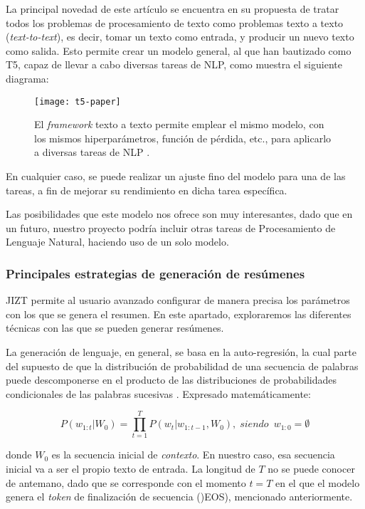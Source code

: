 La principal novedad de este artículo se encuentra en su propuesta de tratar todos los problemas de procesamiento de texto como problemas texto a texto (\emph{text-to-text}), es decir, tomar un texto como entrada, y producir un nuevo texto como salida. Esto permite crear un modelo general, al que han bautizado como T5, capaz de llevar a cabo diversas tareas de NLP, como muestra el siguiente diagrama:

\bigskip


\begin{figure}[h]
	\centering
	\texttt{[image: t5-paper]}
	\caption[Ejemplo del modelo T5 de Google.]{El \emph{framework} texto a texto permite emplear el mismo modelo, con los mismos hiperparámetros, función de pérdida, etc., para aplicarlo a diversas tareas de NLP \cite{raffel19}.}
\end{figure}


En cualquier caso, se puede realizar un ajuste fino del modelo para una de las tareas, a fin de mejorar su rendimiento en dicha tarea específica.

Las posibilidades que este modelo nos ofrece son muy interesantes, dado que en un futuro, nuestro proyecto podría incluir otras tareas de Procesamiento de Lenguaje Natural, haciendo uso de un solo modelo.


\bigskip
\subsubsection{Principales estrategias de generación de resúmenes} \label{subsec:estrategias-gen}

JIZT permite al usuario avanzado configurar de manera precisa los parámetros con los que se genera el resumen. En este apartado, exploraremos las diferentes técnicas con las que se pueden generar resúmenes.

La generación de lenguaje, en general, se basa en la auto-regresión, la cual parte del supuesto de que la distribución de probabilidad de una secuencia de palabras puede descomponerse en el producto de las distribuciones de probabilidades  condicionales de las palabras sucesivas \cite{platen20}. Expresado matemáticamente:

\[ P(w_{1:t} | W_0) = \prod_{t=1}^{T} P(w_t | w_{1:t-1}, W_0), \; siendo \enspace w_{1:0} = \emptyset \]

donde $W_0$ es la secuencia inicial de \emph{contexto}. En nuestro caso, esa secuencia inicial va a ser el propio texto de entrada. La longitud de $T$ no se puede conocer de antemano, dado que se corresponde con el momento $t = T$ en el que el modelo genera el \emph{token} de finalización de secuencia ()EOS), mencionado anteriormente.

